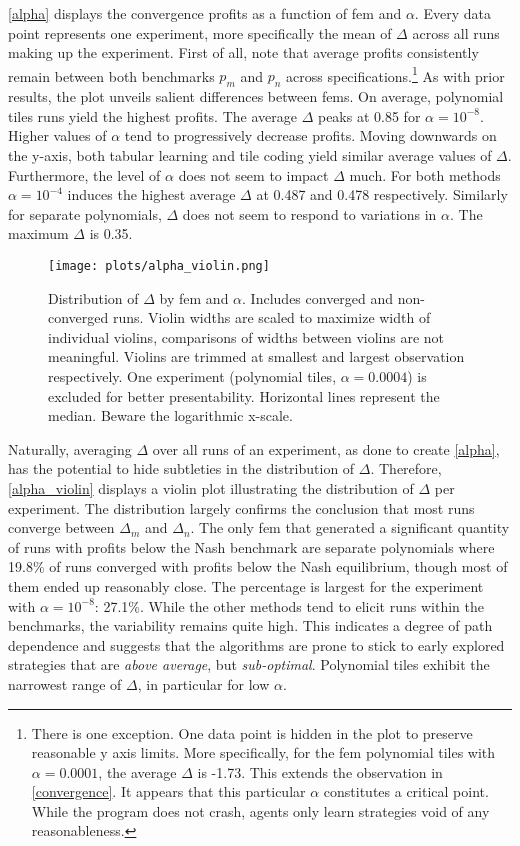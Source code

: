 \autoref{alpha} displays the convergence profits as a function of \gls{fem} and $\alpha$. Every data point represents one experiment, more specifically the mean of $\Delta$ across all runs making up the experiment. First of all, note that average profits consistently remain between both benchmarks $p_m$ and $p_n$ across specifications.\footnote{There is one exception. One data point is hidden in the plot to preserve reasonable y axis limits. More specifically, for the \gls{fem} polynomial tiles with $\alpha = 0.0001$, the average $\Delta$ is -1.73. This extends the observation in \autoref{convergence}. It appears that this particular $\alpha$ constitutes a critical point. While the program does not crash, agents only learn strategies void of any reasonableness.} As with prior results, the plot unveils salient differences between \gls{fem}s. On average, polynomial tiles runs yield the highest profits. The average $\Delta$ peaks at 0.85 for $\alpha = 10^{-8}$. Higher values of $\alpha$ tend to progressively decrease profits. Moving downwards on the y-axis, both tabular learning and tile coding yield similar average values of $\Delta$. Furthermore, the level of $\alpha$ does not seem to impact $\Delta$ much. For both methods $\alpha = 10^{-4}$ induces the highest average $\Delta$ at 0.487 and 0.478 respectively. Similarly for separate polynomials, $\Delta$ does not seem to respond to variations in $\alpha$. The maximum $\Delta$ is 0.35.

\begin{figure}
	\texttt{[image: plots/alpha\_violin.png]}
	\caption[Distribution of $\Delta$ by \gls{fem} and $\alpha$]{Distribution of $\Delta$ by \gls{fem} and $\alpha$. Includes converged and non-converged runs. Violin widths are scaled to maximize width of individual violins, comparisons of widths between violins are not meaningful. Violins are trimmed at smallest and largest observation respectively. One experiment (polynomial tiles, $\alpha = 0.0004$) is excluded for better presentability. Horizontal lines represent the median. Beware the logarithmic x-scale.}
	\label{alpha_violin}
\end{figure}

Naturally, averaging $\Delta$ over all runs of an experiment, as done to create \autoref{alpha},  has the potential to hide subtleties in the distribution of $\Delta$. Therefore, \autoref{alpha_violin} displays a violin plot illustrating the distribution of $\Delta$ per experiment. The distribution largely confirms the conclusion that most runs converge between $\Delta_m$ and $\Delta_n$. The only \gls{fem} that generated a significant quantity of runs with profits below the Nash benchmark are separate polynomials where 19.8\% of runs converged with profits below the Nash equilibrium, though most of them ended up reasonably close. The percentage is largest for the experiment with $\alpha = 10^{-8}$: 27.1\%. While the other methods tend to elicit runs within the benchmarks, the variability remains quite high. This indicates a degree of path dependence and suggests that the algorithms are prone to stick to early explored strategies that are \emph{above average}, but \emph{sub-optimal}. Polynomial tiles exhibit the narrowest range of $\Delta$, in particular for low $\alpha$.

